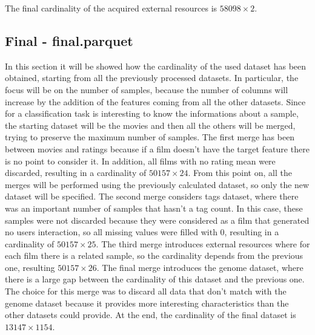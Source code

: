 \documentclass[../main]{subfiles}
\begin{document}
The final cardinality of the acquired external resources is $58098 \times 2$.

\subsection*{Final - final.parquet}
In this section it will be showed how the cardinality of the used dataset has been obtained, starting from all the previously processed datasets.
In particular, the focus will be on the number of samples, because the number of columns will increase by the addition of the features coming from all the other datasets.
Since for a classification task is interesting to know the informations about a sample, the starting dataset will be the movies and then all the others will be merged, trying to preserve the maximum number of samples.
The first merge has been between movies and ratings because if a film doesn’t have the target feature there is no point to consider it.
In addition, all films with no rating mean were discarded, resulting in a cardinality of $50157 \times 24$.
From this point on, all the merges will be performed using the previously calculated dataset, so only the new dataset will be specified.
The second merge considers tags dataset, where there was an important number of samples that hasn't a tag count.
In this case, these samples were not discarded because they were considered as a film that generated no users interaction, so all missing values were filled with 0, resulting in a cardinality of $50157 \times 25$.
The third merge introduces external resources where for each film there is a related sample, so the cardinality depends from the previous one, resulting $50157 \times 26$.
The final merge introduces the genome dataset, where there is a large gap between the cardinality of this dataset and the previous one.
The choice for this merge was to discard all data that don't match with the genome dataset because it provides more interesting characteristics than the other datasets could provide.
At the end, the cardinality of the final dataset is $13147 \times 1154$.
\end{document}
